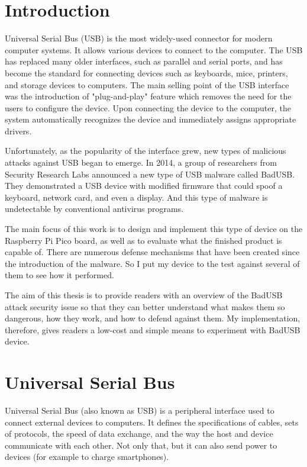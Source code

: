 \chapter{Introduction}
Universal Serial Bus (USB) is the most widely-used connector for modern computer systems. It allows various devices to connect to the computer. The USB has replaced many older interfaces, such as parallel and serial ports, and has become the standard for connecting devices such as keyboards, mice, printers, and storage devices to computers. The main selling point of the USB interface was the introduction of "plug-and-play" feature which removes the need for the users to configure the device. Upon connecting the device to the computer, the system automatically recognizes the device and immediately assigns appropriate drivers.

Unfortunately, as the popularity of the interface grew, new types of malicious attacks against USB began to emerge. In 2014, a group of researchers from Security Research Labs announced a new type of USB malware called BadUSB. They demonstrated a USB device with modified firmware that could spoof a keyboard, network card, and even a display. And this type of malware is undetectable by conventional antivirus programs.

The main focus of this work is to design and implement this type of device on the Raspberry Pi Pico board, as well as to evaluate what the finished product is capable of. There are numerous defense mechanisms that have been created since the introduction of the malware. So I put my device to the test against several of them to see how it performed.

The aim of this thesis is to provide readers with an overview of the BadUSB attack security issue so that they can better understand what makes them so dangerous, how they work, and how to defend against them. My implementation, therefore, gives readers a low-cost and simple means to experiment with BadUSB device.


\chapter{Universal Serial Bus}
\label{ch:usb}
Universal Serial Bus (also known as USB) is a peripheral interface used to connect external devices to computers. It defines the specifications of cables, sets of protocols, the speed of data exchange, and the way the host and device communicate with each other. Not only that, but it can also send power to devices (for example to charge smartphones).

